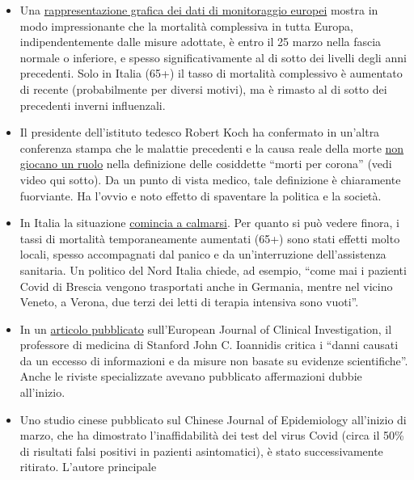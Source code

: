 \begin{itemize}
\tightlist
\item
  Una
  \href{https://off-guardian.org/2020/03/30/covid19-yet-to-impact-europes-overall-mortality/}{rappresentazione
  grafica dei dati di monitoraggio europei} mostra in modo
  impressionante che la mortalità complessiva in tutta Europa,
  indipendentemente dalle misure adottate, è entro il 25 marzo nella
  fascia normale o inferiore, e spesso significativamente al di sotto
  dei livelli degli anni precedenti. Solo in Italia (65+) il tasso di
  mortalità complessivo è aumentato di recente (probabilmente per
  diversi motivi), ma è rimasto al di sotto dei precedenti inverni
  influenzali.
\item
  Il presidente dell'istituto tedesco Robert Koch ha confermato in
  un'altra conferenza stampa che le malattie precedenti e la causa reale
  della morte
  \href{https://swprs.org/rki-relativiert-corona-todesfaelle/}{non
  giocano un ruolo} nella definizione delle cosiddette ``morti per
  corona'' (vedi video qui sotto). Da un punto di vista medico, tale
  definizione è chiaramente fuorviante. Ha l'ovvio e noto effetto di
  spaventare la politica e la società.
\item
  In Italia la situazione
  \href{https://www.tagesspiegel.de/politik/die-verlangsamung-ist-da-in-italien-zeichnet-sich-die-wende-in-der-coronakrise-ab/25698124.html}{comincia
  a calmarsi}. Per quanto si può vedere finora, i tassi di mortalità
  temporaneamente aumentati (65+) sono stati effetti molto locali,
  spesso accompagnati dal panico e da un'interruzione dell'assistenza
  sanitaria. Un politico del Nord Italia chiede, ad esempio, ``come mai
  i pazienti Covid di Brescia vengono trasportati anche in Germania,
  mentre nel vicino Veneto, a Verona, due terzi dei letti di terapia
  intensiva sono vuoti''.
\item
  In un
  \href{https://onlinelibrary.wiley.com/doi/abs/10.1111/eci.13222}{articolo
  pubblicato} sull'European Journal of Clinical Investigation, il
  professore di medicina di Stanford John C. Ioannidis critica i ``danni
  causati da un eccesso di informazioni e da misure non basate su
  evidenze scientifiche''. Anche le riviste specializzate avevano
  pubblicato affermazioni dubbie all'inizio.
\item
  Uno studio cinese pubblicato sul Chinese Journal of Epidemiology
  all'inizio di marzo, che ha dimostrato l'inaffidabilità dei test del
  virus Covid (circa il 50\% di risultati falsi positivi in pazienti
  asintomatici), è stato successivamente ritirato. L'autore principale

\end{itemize}
